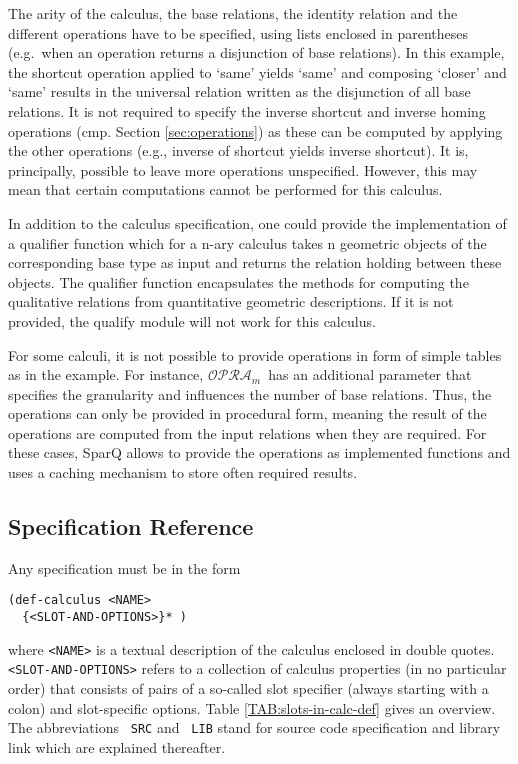 \documentclass[headsepline]{scrreprt}
\theoremstyle{definition}
\newcommand{\engine}{SparQ}
\newcommand{\opra}{$\mathcal{OPRA}_m$}
\begin{document}
\lstset{language=LISP}


The arity of the calculus, the base relations, the identity relation and the
different operations have to be specified, using lists enclosed in parentheses
(e.g.\ when an operation returns a disjunction of base relations). In this
example, the shortcut operation applied to `same' yields `same' and composing
`closer' and `same' results in the universal relation written as the disjunction
of all base relations. It is not required to specify the inverse shortcut and inverse homing operations (cmp. Section \ref{sec:operations}) as these can be computed by applying the other operations (e.g., inverse
of shortcut yields inverse shortcut). It is, principally,
possible to leave more operations unspecified. However, this may mean that certain computations cannot be performed for this calculus.

In addition to the calculus specification, one could provide the
implementation of a qualifier function which for a n-ary calculus takes n geometric objects of the corresponding base type as input
and returns the relation holding between these objects. The qualifier
function  encapsulates the methods for computing the qualitative relations
from quantitative geometric descriptions.
If it is not provided, the qualify module will not work for this calculus.

For some calculi, it is not possible to provide operations in form of simple
tables as in the example. For instance, \opra\ has an additional parameter that specifies the granularity and  influences the number of base relations.  Thus, the operations can only be
provided in procedural form, meaning the result of the operations are
computed from the input relations when they are required. For these cases,
\engine{} allows to provide the operations as implemented functions and
uses a caching mechanism to store often required results.

\subsection{Specification Reference}

Any specification must be in the form

\begin{verbatim}
(def-calculus <NAME>
  {<SLOT-AND-OPTIONS>}* )
\end{verbatim}
where \verb=<NAME>= is a textual description of the calculus enclosed in double quotes. \linebreak[4]
\verb=<SLOT-AND-OPTIONS>= refers to a collection of calculus properties (in no particular order) that consists of pairs of a so-called slot specifier (always starting with a colon) and slot-specific options. Table \ref{TAB:slots-in-calc-def} gives an overview. The abbreviations \texttt{ SRC} and \texttt{ LIB} stand for source code specification and library link which are explained thereafter.
\end{document}

